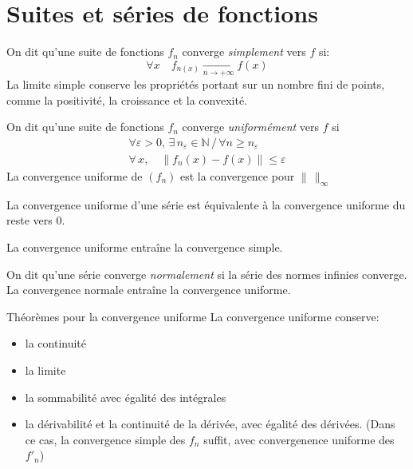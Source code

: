 \documentclass[french, a4paper, 10pt, twocolumn]{article}
\newcommand{\N}{\mathbb{N}}   %
\begin{document}
\section{Suites et séries de fonctions}
\begin{definition}
  On dit qu'une suite de fonctions \(f_{n}\) converge \emph{simplement} vers \(f\) si:
  \[\forall x\quad f_{n(x)}\xrightarrow[n\rightarrow +\infty]{} f(x)\]
  La limite simple conserve les propriétés portant sur un nombre fini de points, comme la positivité, la croissance et la convexité.
\end{definition}

\begin{definition}
  On dit qu'une suite de fonctions \(f_{n}\) converge \emph{uniformément} vers \(f\) si
  \begin{align*}
    \forall \varepsilon >0,\,\exists\, n_{\varepsilon}\in\N \,\slash\, \forall n\geqslant n_{\varepsilon} \\
    \forall\, x,\quad \left\lVert f_{n}(x)-f(x)\right\rVert \leqslant \varepsilon
  \end{align*}
  La convergence uniforme de \((f_{n})\) est la convergence pour \(\lVert\,\rVert_{\infty}\)

  La convergence uniforme d'une série est équivalente à la convergence uniforme du reste vers \(0\).

  La convergence uniforme entraîne la convergence simple.
\end{definition}

\begin{definition}
  On dit qu'une série converge \emph{normalement} si la série des normes infinies converge.
  La convergence normale entraîne la convergence uniforme.
\end{definition}

\begin{theoreme}{Théorèmes pour la convergence uniforme}
  La convergence uniforme conserve:
  \begin{itemize}
    \item la continuité
    \item la limite
    \item la sommabilité avec égalité des intégrales
    \item la dérivabilité et la continuité de la dérivée, avec égalité des dérivées. (Dans ce cas, la convergence simple des $f_{n}$ suffit, avec convergenence uniforme des $f'_{n}$)
  \end{itemize}
\end{theoreme}
\end{document}
